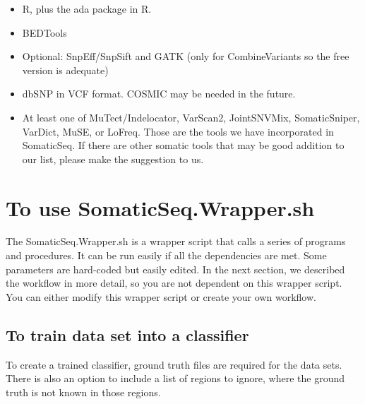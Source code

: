 \documentclass[10pt,letterpaper]{article}
\begin{document}
\begin{sloppypar}
\begin{itemize}
\item
R, plus the ada package in R.

\item
BEDTools

\item
Optional: SnpEff/SnpSift and GATK (only for CombineVariants so the free version is adequate)

\item
dbSNP in VCF format. COSMIC may be needed in the future.

\item
At least one of MuTect/Indelocator, VarScan2, JointSNVMix, SomaticSniper, VarDict, MuSE, or LoFreq. Those are the tools we have incorporated in SomaticSeq. If there are other somatic tools that may be good addition to our list, please make the suggestion to us. 

\end{itemize}



\section{To use SomaticSeq.Wrapper.sh}

The SomaticSeq.Wrapper.sh is a wrapper script that calls a series of programs and procedures. It can be run easily if all the dependencies are met. Some parameters are hard-coded but easily edited. In the next section, we described the workflow in more detail, so you are not dependent on this wrapper script. You can either modify this wrapper script or create your own workflow. 


\subsection{To train data set into a classifier}

To create a trained classifier, ground truth files are required for the data sets. There is also an option to include a list of regions to ignore, where the ground truth is not known in those regions. 


\end{sloppypar}
\end{document}
